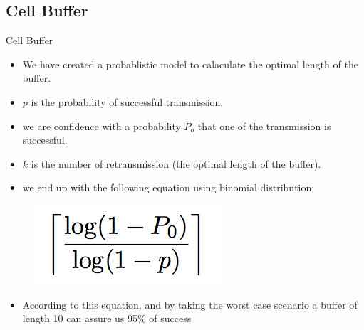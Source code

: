 \subsection{Cell Buffer}
\begin{withoutheadline}
\begin{frame}{Cell Buffer}

\begin{itemize}
    \item We have created a probablistic model to calaculate the optimal length of the buffer.
    \item<2-> $p$ is the probability of successful transmission.
    \item<3-> we are confidence with a probability $P_{o}$ that one of the transmission is successful.
    \item<4-> $k$ is the number of retransmission (the optimal length of the buffer). 
    \item<5-> we end up with the following equation using binomial distribution:
    
    \end{itemize}
    
 \centering
\begin{figure}[p]

\item<5-> \includegraphics[width=0.3\linewidth]{figures/9nq6n.png}
\end{figure}
\begin{itemize}
\item<6-> According to this equation, and by taking the worst case scenario a buffer of length 10 can assure us 95\% of success
 \end{itemize}
\end{frame}
\end{withoutheadline}